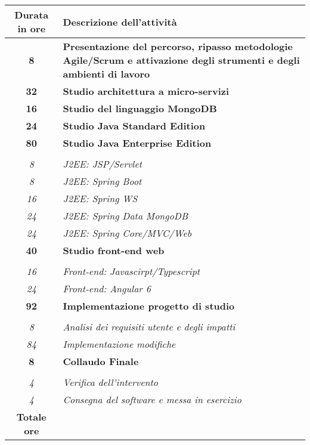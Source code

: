 

\begin{tabularx}{\textwidth}{|cX|}
	\hline
	\textbf{Durata in ore} & \textbf{Descrizione dell'attività} \\\hline

	\textbf{8} & \textbf{Presentazione del percorso, ripasso metodologie Agile/Scrum e attivazione degli strumenti e degli ambienti di lavoro} \\
\hline

    \textbf{32} & \textbf{Studio architettura a micro-servizi} \\\hline
    \textbf{16} & \textbf{Studio del linguaggio MongoDB}\\\hline
    \textbf{24} & \textbf{Studio Java Standard Edition}\\\hline

    \textbf{80} & \textbf{Studio Java Enterprise Edition}\\\hdashline
    \multirow{5}{0cm}\\
    \textit{8} &
    \textit{J2EE: JSP/Servlet}\\
    \textit{8} &
    \textit{J2EE: Spring Boot}\\
    \textit{16} &
    \textit{J2EE: Spring WS}\\
    \textit{24} &
    \textit{J2EE: Spring Data MongoDB}\\
    \textit{24} &
    \textit{J2EE: Spring Core/MVC/Web}\\\hline

    \textbf{40} & \textbf{Studio front-end web}\\\hdashline
    \multirow{2}{0cm}\\
    \textit{16} &
    \textit{Front-end: Javascirpt/Typescript}\\
    \textit{24} &
    \textit{Front-end: Angular 6}\\\hline

    \textbf{92} & \textbf{Implementazione progetto di studio}\\\hdashline
    \multirow{2}{0cm}\\
    \textit{8} &
    \textit{Analisi dei requisiti utente e degli impatti}\\
    \textit{84} &
    \textit{Implementazione modifiche} \\\hline

    \textbf{8} & \textbf{Collaudo Finale}\\\hdashline
    \multirow{2}{0cm}\\
    \textit{4} &
    \textit{Verifica dell'intervento}\\
    \textit{4} &
    \textit{Consegna del software e messa in esercizio} \\\hline

	\textbf{Totale ore} & \multicolumn{1}{c|}{\textbf{\totaleOre}} \\\hline


\end{tabularx}
